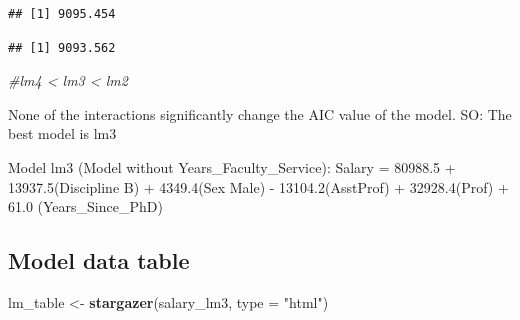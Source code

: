 \documentclass[]{article}
\newenvironment{Shaded}{\begin{snugshade}}{\end{snugshade}}
\newcommand{\KeywordTok}[1]{\textcolor[rgb]{0.13,0.29,0.53}{\textbf{#1}}}
\newcommand{\DataTypeTok}[1]{\textcolor[rgb]{0.13,0.29,0.53}{#1}}
\newcommand{\StringTok}[1]{\textcolor[rgb]{0.31,0.60,0.02}{#1}}
\newcommand{\CommentTok}[1]{\textcolor[rgb]{0.56,0.35,0.01}{\textit{#1}}}
\newcommand{\NormalTok}[1]{#1}
\begin{document}
\begin{verbatim}
## [1] 9095.454
\end{verbatim}

\begin{Shaded}
\end{Shaded}

\begin{verbatim}
## [1] 9093.562
\end{verbatim}

\begin{Shaded}
\begin{Highlighting}[]
\CommentTok{#lm4 < lm3 < lm2}
\end{Highlighting}
\end{Shaded}

None of the interactions significantly change the AIC value of the
model. SO: The best model is lm3

Model lm3 (Model without Years\_Faculty\_Service): Salary = 80988.5 +
13937.5(Discipline B) + 4349.4(Sex Male) - 13104.2(AsstProf) +
32928.4(Prof) + 61.0 (Years\_Since\_PhD)

\subsection{Model data table}\label{model-data-table}

\begin{Shaded}
\begin{Highlighting}[]
\NormalTok{lm_table <-}\StringTok{ }\KeywordTok{stargazer}\NormalTok{(salary_lm3, }\DataTypeTok{type =} \StringTok{"html"}\NormalTok{)}
\end{Highlighting}
\end{Shaded}
\end{document}
